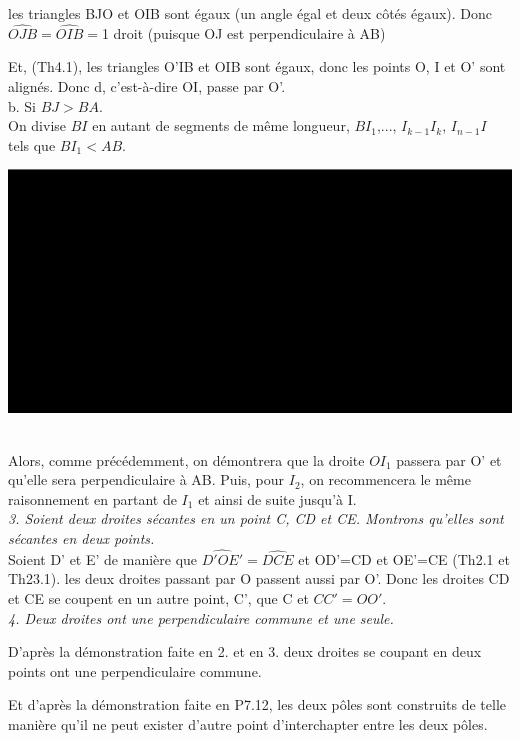 \documentclass[a4paper, 12pt, twoside]{book}
\begin{document}
 les triangles BJO et OIB sont égaux (un angle égal et deux côtés égaux). Donc  $\hat{OJB}=\hat{OIB}=$1 droit (puisque OJ est perpendiculaire à AB)\
 
 Et, (Th4.1), les triangles O'IB et OIB sont égaux, donc les points O, I et O' sont alignés. Donc d, c'est-à-dire OI, passe par O'.\\
 
 b. Si $BJ>BA$.\\
 
 On divise $BI$ en autant de segments de même longueur, $BI_{1}$,..., $I_{k-1}I_{k}$, $I_{n-1}I$ tels que $BI_{1}<AB$.  
 
   \includegraphics[scale=0.6]{figures/sacc23.eps} \ 
   
   Alors, comme précédemment, on démontrera que la droite $OI_{1}$ passera par O' et qu'elle sera perpendiculaire à AB. Puis, pour $I_{2}$, on recommencera le même raisonnement en partant de $I_{1}$ et ainsi de suite jusqu'à I.\\
   
  \textit{3. Soient deux droites sécantes en un point C, CD et CE. Montrons qu'elles sont sécantes en deux points.} \\
  
   
   Soient D' et E' de manière que $\hat{D'OE'}=\hat{DCE}$ et OD'=CD et OE'=CE (Th2.1 et Th23.1). les deux droites passant par O passent aussi par O'. Donc les droites CD et CE se coupent en un autre point, C', que C et $CC'=OO'$.\\
   
   \textit{4. Deux droites ont une perpendiculaire commune et une seule.}\
   
   D'après la démonstration faite en 2. et en 3. deux droites se coupant en deux points ont une perpendiculaire commune.\
   
   Et d'après la démonstration faite en P7.12, les deux pôles sont construits de telle manière qu'il ne peut exister d'autre point d'interchapter entre les deux pôles.\
   
\end{document}
